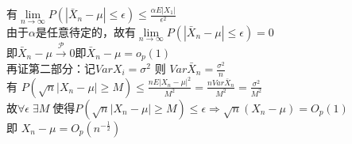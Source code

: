 \documentclass[12pt,a4paper]{ctexart}
\begin{document}
 $\displaystyle \text{有}\lim\limits_{n \to \infty}P(|\bar{X}_n - \mu|\le \epsilon) \leq \frac{\alpha E|X_1|}{\epsilon^2}
 $\\
 由于$\alpha$是任意待定的，故有$\lim\limits_{n \to \infty}P(|\bar{X}_n - \mu|\le \epsilon)  = 0$\\
 即$\bar{X}_n - \mu \xrightarrow{\mathcal{P}} 0 $即$\bar{X}_n - \mu = o_p(1)$\\
 再证第二部分：记$VarX_i = \sigma^2$ 则 $Var\bar{X}_n = \frac{\sigma^2}{n}$\\
 有
 $\displaystyle P(\sqrt{n}|X_n - \mu| \geq M) \leq \frac{nE|X_n - \mu|^2}{M^2} = \frac{nVar\bar{X}_n}{M^2} = \frac{\sigma^2}{M^2}$\\
 故$\forall \epsilon \; \exists M \; \text{使得}P(\sqrt{n}|X_n - \mu| \geq M) \leq \epsilon \Rightarrow \sqrt{n}(X_n - \mu) = O_p(1) $\\
 即 $X_n - \mu = O_p(n^{-\frac{1}{2}})$
\end{document}
